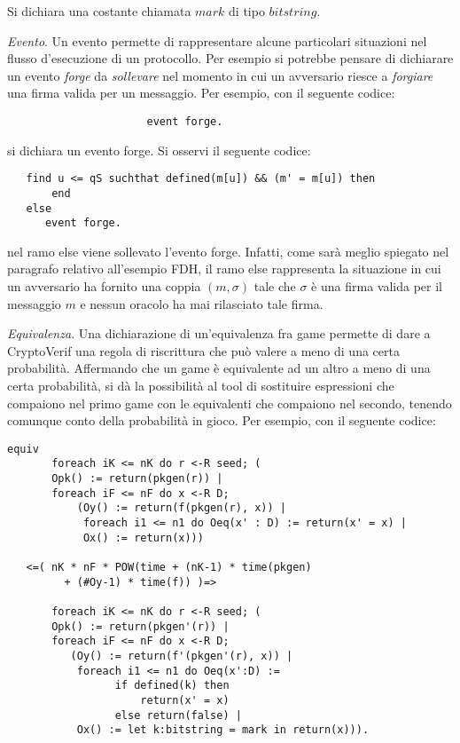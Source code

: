 \documentclass[a4paper,openright,twoside,12pt]{report}
\begin{document}
\begin{description}
	Si dichiara una costante chiamata $mark$ di tipo $bitstring$.
 \item{\emph{Evento}.} Un evento permette di rappresentare alcune particolari situazioni nel flusso d'esecuzione di un protocollo. Per esempio si potrebbe
		pensare di dichiarare un evento \emph{forge} da \emph{sollevare} nel momento in cui un avversario riesce a \emph{forgiare} una firma
		valida per un messaggio. Per esempio, con il seguente codice:
 

				      \begin{verbatim}
				      event forge.
				      \end{verbatim}
 
	      si dichiara un evento forge. Si osservi il seguente codice: 
 

				      \begin{verbatim}
   find u <= qS suchthat defined(m[u]) && (m' = m[u]) then 
       end
   else      
      event forge.

				      \end{verbatim}
 
nel ramo else viene sollevato l'evento forge. Infatti, come sar\`a meglio spiegato nel paragrafo relativo all'esempio FDH, il ramo else rappresenta la situazione in cui un avversario ha fornito
una coppia $(m, \sigma)$ tale che $\sigma$ \`e una firma valida per il messaggio $m$ e nessun oracolo ha mai rilasciato tale firma.
 \item{\emph{Equivalenza}.} Una dichiarazione di un'equivalenza fra game permette di dare a CryptoVerif una regola di riscrittura che pu\`o valere
		    a meno di una certa probabilit\`a. Affermando che un game \`e equivalente ad un altro a meno di una certa probabilit\`a, 
		    si d\`a la possibilit\`a al tool di sostituire espressioni che compaiono nel primo game con le equivalenti che compaiono nel secondo, 
tenendo comunque conto della probabilit\`a in gioco.
Per esempio, con il seguente codice:
\newpage

 \begin{verbatim}
equiv 
       foreach iK <= nK do r <-R seed; (
       Opk() := return(pkgen(r)) |
       foreach iF <= nF do x <-R D;
           (Oy() := return(f(pkgen(r), x)) |
            foreach i1 <= n1 do Oeq(x' : D) := return(x' = x) |
            Ox() := return(x)))
   
   <=( nK * nF * POW(time + (nK-1) * time(pkgen)
         + (#Oy-1) * time(f)) )=>
       
       foreach iK <= nK do r <-R seed; (
       Opk() := return(pkgen'(r)) |
       foreach iF <= nF do x <-R D;
          (Oy() := return(f'(pkgen'(r), x)) |
           foreach i1 <= n1 do Oeq(x':D) :=
                 if defined(k) then 
                     return(x' = x) 
                 else return(false) |
           Ox() := let k:bitstring = mark in return(x))).
 \end{verbatim}
 



\end{description}
\end{document}
